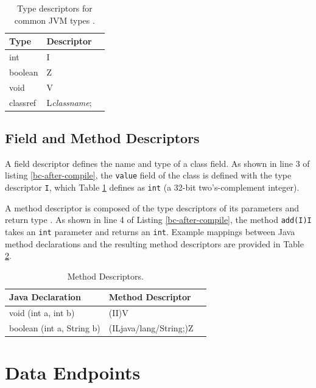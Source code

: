 \begin{table}[htbp]
  \centering
  \begin{tabular}{ | l | l | p{5cm} |}
  \hline
  \textbf{Type} & \textbf{Descriptor} \\ \hline
  int & I \\ \hline
  boolean & Z \\ \hline
  void & V \\ \hline
  classref & L\emph{classname}; \\ \hline
  \end{tabular}
  \caption[Type Descriptors]{Type descriptors for common JVM types \cite[4.3.3]{jvms7}.}
  \label{table:type-descriptors}
\end{table}

\subsection{Field and Method Descriptors}

A field descriptor defines the name and type of a class field.  As shown in line 3 of listing \ref{bc-after-compile}, the \texttt{value} field of the class is defined with the type descriptor \texttt{I}, which Table \ref{table:type-descriptors} defines as \texttt{int} (a 32-bit two's-complement integer).

A method descriptor is composed of the type descriptors of its parameters and return type \cite[4.3.3]{jvms7}.  As shown in line 4 of Listing \ref{bc-after-compile}, the method \texttt{add(I)I} takes an \texttt{int} parameter and returns an \texttt{int}.  Example mappings between Java method declarations and the resulting method descriptors are provided in Table \ref{table:method-descriptors}.

\begin{table}[htbp]
  \centering
  \begin{tabular}{ | l | l | p{5cm} |}
  \hline
  \textbf{Java Declaration} & \textbf{Method Descriptor} \\ \hline
  void (int a, int b) & (II)V \\ \hline
  boolean (int a, String b) & (ILjava/lang/String;)Z \\ \hline
  \end{tabular}
  \caption[Method Descriptors]{Method Descriptors.}
  \label{table:method-descriptors}
\end{table}


\section{Data Endpoints}

